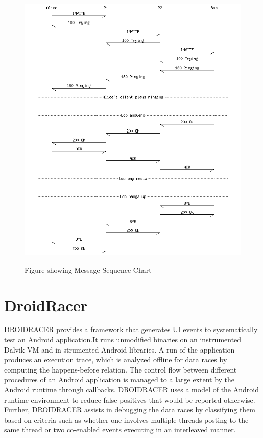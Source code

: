 \documentclass[11pt]{report}
\begin{document}
\begin{figure}[ht!]
\centering
\includegraphics[width=150mm]{./images/msg.png}\\
\caption{Figure showing Message Sequence Chart}
\end{figure}

\chapter{DroidRacer}
\par DROIDRACER provides  a  framework  that generates UI events to systematically test an Android application.It runs unmodified binaries on an instrumented Dalvik VM and in-strumented
Android libraries. A run of the application produces an execution trace, which is analyzed offline for data races by computing the happens-before relation. The control flow between 
different procedures of an Android application is managed to a large extent by  the  Android  runtime  through  callbacks.  DROIDRACER uses  a model of the Android runtime environment to reduce false positives
that would be reported otherwise. Further, DROIDRACER assists in debugging the data races by classifying them based on criteria such as whether one involves multiple threads posting to the same thread
or two co-enabled events executing in an interleaved manner.\\
\end{document}
